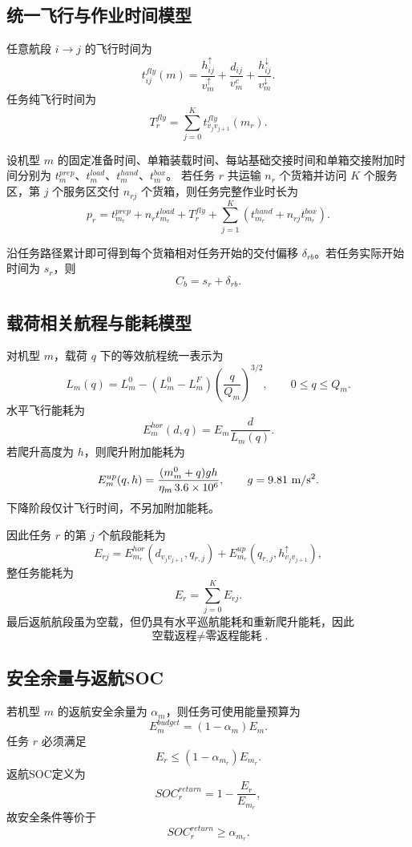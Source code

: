 \documentclass[UTF8,a4paper,12pt]{ctexart}
\begin{document}
\subsection{统一飞行与作业时间模型}

任意航段 $i\rightarrow j$ 的飞行时间为
\[
t_{ij}^{fly}(m)
=
\frac{h_{ij}^{\uparrow}}{v_m^{\uparrow}}
+
\frac{d_{ij}}{v_m^c}
+
\frac{h_{ij}^{\downarrow}}{v_m^{\downarrow}}.
\]
任务纯飞行时间为
\[
T_r^{fly}
=
\sum_{j=0}^{K}
t_{v_jv_{j+1}}^{fly}(m_r).
\]

设机型 $m$ 的固定准备时间、单箱装载时间、每站基础交接时间和单箱交接附加时间分别为
$t_m^{prep}$、$t_m^{load}$、$t_m^{hand}$、$t_m^{box}$。
若任务 $r$ 共运输 $n_r$ 个货箱并访问 $K$ 个服务区，第 $j$ 个服务区交付 $n_{rj}$ 个货箱，则任务完整作业时长为
\[
p_r
=
t_{m_r}^{prep}
+
n_rt_{m_r}^{load}
+
T_r^{fly}
+
\sum_{j=1}^{K}
\left(
t_{m_r}^{hand}
+
n_{rj}t_{m_r}^{box}
\right).
\]

沿任务路径累计即可得到每个货箱相对任务开始的交付偏移 $\delta_{rb}$。若任务实际开始时间为 $s_r$，则
\[
C_b=s_r+\delta_{rb}.
\]

\subsection{载荷相关航程与能耗模型}

对机型 $m$，载荷 $q$ 下的等效航程统一表示为
\[
\boxed{
L_m(q)
=
L_m^0
-
(L_m^0-L_m^F)
\left(\frac{q}{Q_m}\right)^{3/2}
},
\qquad 0\le q\le Q_m.
\]
水平飞行能耗为
\[
E_m^{hor}(d,q)
=
E_m\frac{d}{L_m(q)}.
\]
若爬升高度为 $h$，则爬升附加能耗为
\[
E_m^{up}(q,h)
=
\frac{(m_m^0+q)gh}{\eta_m\,3.6\times10^6},
\qquad g=9.81\ {\rm m/s^2}.
\]
下降阶段仅计飞行时间，不另加附加能耗。

因此任务 $r$ 的第 $j$ 个航段能耗为
\[
E_{rj}
=
E_{m_r}^{hor}
(d_{v_jv_{j+1}},q_{r,j})
+
E_{m_r}^{up}
(q_{r,j},h_{v_jv_{j+1}}^\uparrow),
\]
整任务能耗为
\[
E_r=\sum_{j=0}^{K}E_{rj}.
\]
最后返航航段虽为空载，但仍具有水平巡航能耗和重新爬升能耗，因此
\[
\boxed{\text{空载返程}\neq\text{零返程能耗}}.
\]

\subsection{安全余量与返航SOC}

若机型 $m$ 的返航安全余量为 $\alpha_m$，则任务可使用能量预算为
\[
E_m^{budget}=(1-\alpha_m)E_m.
\]
任务 $r$ 必须满足
\[
E_r\le(1-\alpha_{m_r})E_{m_r}.
\]
返航SOC定义为
\[
SOC_r^{return}
=
1-\frac{E_r}{E_{m_r}},
\]
故安全条件等价于
\[
SOC_r^{return}\ge\alpha_{m_r}.
\]
\end{document}
